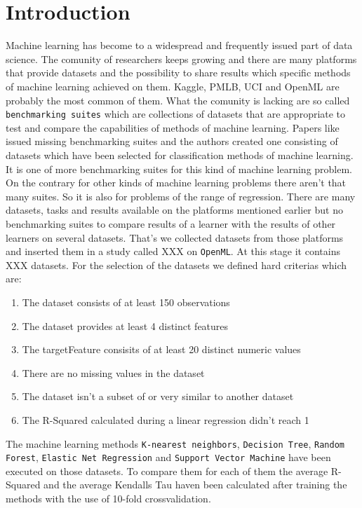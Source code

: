 \documentclass[a4paper]{article}
\begin{document}
\section{Introduction}
Machine learning has become to a widespread and frequently issued part of data science. The comunity of researchers keeps growing and there are many platforms that provide datasets and the possibility to share results which specific methods of machine learning achieved on them. Kaggle, PMLB, UCI and OpenML are probably the most common of them. 
\newline 
What the comunity is lacking are so called \texttt{benchmarking suites} which are collections of datasets that are appropriate to test and compare the capabilities of methods of machine learning.
Papers like \citet{Bischl2017} issued missing benchmarking suites and the authors created one consisting of datasets which have been selected for classification methods of machine learning. \newline 
It is one of more benchmarking suites for this kind of machine learning problem. \newline 
On the contrary for other kinds of machine learning problems there aren't that many suites. \newline 
So it is also for problems of the range of regression. There are many datasets, tasks and results available on the platforms mentioned earlier but no benchmarking suites to compare results of a learner with the results of other learners on several datasets. That's we collected datasets from those platforms and inserted them in a study called XXX on \texttt{OpenML}. 
At this stage it contains XXX datasets.
For the selection of the datasets we defined hard criterias which are: 
\begin{enumerate}
	\item The dataset consists of at least 150 observations 
	\item The dataset provides at least 4 distinct features 
	\item The targetFeature consisits of at least 20 distinct numeric values 
	\item There are no missing values in the dataset 
	\item The dataset isn't a subset of or very similar to another dataset 
	\item The R-Squared calculated during a linear regression didn't reach 1
\end{enumerate}
The machine learning methods \texttt{K-nearest neighbors}, \texttt{Decision Tree}, \texttt{Random Forest}, \texttt{Elastic Net Regression} and \texttt{Support Vector Machine} have been executed on those datasets. 
\newline 
To compare them for each of them the average R-Squared and the average Kendalls Tau haven been calculated after training the methods with the use of 10-fold crossvalidation.
\end{document}
